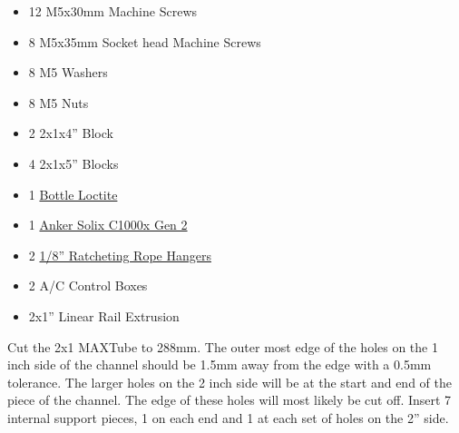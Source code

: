 \begin{partsbox}
\begin{minipage}[t]{\linewidth}
\begin{itemize}
{  Head M5x8mm Machine Screws}
\item
  12 M5x30mm Machine Screws
\item
  8 M5x35mm Socket head Machine Screws
\item
  8 M5 Washers
\item
  8 M5 Nuts
\item
  2 2x1x4'' Block
\item
  4 2x1x5'' Blocks
\item
  1
  \href{https://www.amazon.com/Loctite-242-Threadlocker-Liquid-1-69oz/dp/B002P8LQ1C/ref=sr_1_4?crid=1C7SLWXA3HNCF\&dib=eyJ2IjoiMSJ9.7OmIx_oDHsONqWbeidNiSrahsI0Km1SsrNH3D-gyuZNfhTT6fuPz-yxpn6ouyWCmNM6CYg6vC_Vwy65nIwSK1Zk51und6wQn-HBHnxvXSz_HK_Ug496ZmvlwSMH0ThO-fFtpz10DXtIVyznYEHlvFjtMq0vzz7dSyhbQaQ1VxxJAWf0jfW4wgc0CZbspWrNj9wj5RVRE5bh1iz6qJ_w8ki7GWFobgrXoJeNJ2M0ao4LMAlM5zlhJxdQqxtc9te0Q7sO6Vhc9_SeBVJMOXptmM-4TMQdzEPjVM4bTiYMuMtw.KKRsu1AubScYRtEjyD0dvZ9Ou056x5yyAdyc4josUng\&dib_tag=se\&keywords=Loctite+242\&qid=1780011409\&sprefix=loctite+242\%2Caps\%2C172\&sr=8-4}{Bottle
  Loctite}
\item
  1
  \href{https://www.bestbuy.com/product/anker-solix-c1000x-gen2-portable-power-station-2000w-1024-wh-capacity-dark-gray/JJ858RLLVK}{Anker
  Solix C1000x Gen 2}
\item
  2
  \href{https://www.amazon.com/Fondwell-Adjustable-Reinforced-Internal-Tie-Downs/dp/B0CC55TP9P/ref=sr_1_1?crid=36ZU3G3RCBBAG\&dib=eyJ2IjoiMSJ9.tKxN_u-fARPeq3NN7oKUvKFmazhBJgR5wCeEcW3RRpU.Z9UEwgguOvz_g9mCpK3gWCWXdqGQbj6VpLNOE-pqfa4\&dib_tag=se\&keywords=Fondwell\%2Bhigh-quality\%2B1\%2F8\%22rope\%2Bhangers\&qid=1780012484\&sprefix=fondwell\%2Bhigh-quality\%2B1\%2F8\%2Brope\%2Bhangers\%2Caps\%2C116\&sr=8-1\&th=1}{1/8''
  Ratcheting Rope Hangers}
\item
  2 A/C Control Boxes
\item
  2x1'' Linear Rail Extrusion
\end{itemize}
\end{minipage}
\end{partsbox}

Cut the 2x1 MAXTube to 288mm. The outer most edge of the holes on the 1
inch side of the channel should be 1.5mm away from the edge with a 0.5mm
tolerance. The larger holes on the 2 inch side will be at the start and
end of the piece of the channel. The edge of these holes will most
likely be cut off. Insert 7 internal support pieces, 1 on each end and 1
at each set of holes on the 2'' side.

